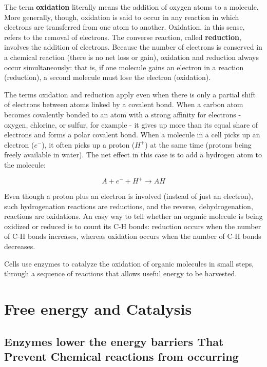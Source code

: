 The term \textbf{oxidation} literally means the addition of oxygen atoms to a
molecule. More generally, though, oxidation is said to occur in any
reaction in which electrons are transferred from one atom to another.
Oxidation, in this sense, refers to the removal of electrons. The converse
reaction, called \textbf{reduction}, involves the addition of electrons.
Because the
number of electrons is conserved in a chemical reaction (there is no net
loss or gain), oxidation and reduction always occur simultaneously: that
is, if one molecule gains an electron in a reaction (reduction), a second
molecule must lose the electron (oxidation).

The terms oxidation and reduction apply even when there is only a partial
shift of electrons between atoms linked by a covalent bond. When a
carbon atom becomes covalently bonded to an atom with a strong affinity
for electrons - oxygen, chlorine, or sulfur, for example - it gives up more
than its equal share of electrons and forms a polar covalent bond.
When a molecule in a cell picks up an electron ($e^{-}$), it often picks up a
proton ($H^{+}$) at the same time (protons being freely available in water).
The net effect in this case is to add a hydrogen atom to the molecule:

\begin{equation}
A + e^{-} +  H^{+} \rightarrow AH
\end{equation}

Even though a proton plus an electron is involved (instead of just an
electron), such hydrogenation reactions are reductions, and the reverse,
dehydrogenation, reactions are oxidations. An easy way to tell whether an
organic molecule is being oxidized or reduced is to count its C-H bonds:
reduction occurs when the number of C-H bonds increases, whereas oxidation
occurs when the number of C-H bonds decreases.

Cells use enzymes to catalyze the oxidation of organic molecules in small steps,
through a sequence of reactions that allows useful energy to be harvested.

\section{Free energy and Catalysis}

\subsection{Enzymes lower the energy barriers That Prevent Chemical reactions from occurring}

